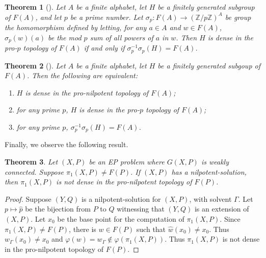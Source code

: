 \documentclass[11pt]{amsart}
\newtheorem{theorem}{Theorem}[section]
\newtheorem{lemma}[theorem]{Lemma}
\theoremstyle{definition}
\theoremstyle{definition}
\numberwithin{equation}{section}
\begin{document}

\begin{theorem}[{\cite[Corollary 3.5]{MSW01}}]\label{thm:MSW} Let $A$ be a finite alphabet, let $H$ be a finitely generated subgroup of $F(A)$, and let $p$ be a prime number. Let $\sigma_p\colon F(A)\to (\mathbb{Z}/p\mathbb{Z})^A$ be group the homomorphism defined by letting, for any $a\in A$ and $w\in F(A)$, $\sigma_p(w)(a)$ be the mod $p$ sum of all powers of $a$ in $w$. Then $H$ is dense in the pro-$p$ topology of $F(A)$ if and only if $\sigma_p^{-1}\sigma_p(H)=F(A)$.
\end{theorem}

\begin{theorem}[{\cite[Corollary 4.2]{MSW01}}] \label{thm:MSW2} Let $A$ be a finite alphabet, let $H$ be a finitely generated subgoup of $F(A)$. Then the following are equivalent:
\begin{enumerate}
\item[\rm (i)] $H$ is dense in the pro-nilpotent topology of $F(A)$;
\item[\rm (ii)] for any prime $p$, $H$ is dense in the pro-$p$ topology of $F(A)$;
\item[\rm (iii)] for any prime $p$, $\sigma_p^{-1}\sigma_p(H)=F(A)$.
\end{enumerate}
\end{theorem}

Finally, we observe the following result.

\begin{theorem}\label{thm:nonil} Let $(X,P)$ be an EP problem where $G(X, P)$ is weakly connected. Suppose $\pi_1(X, P)\neq F(P)$. If $(X, P)$ has a nilpotent-solution, then $\pi_1(X, P)$ is not dense in the pro-nilpotent topology of $F(P)$.
\end{theorem}

\begin{proof} Suppose $(Y, Q)$ is a nilpotent-solution for $(X, P)$, with solvent $\Gamma$. Let $p\mapsto \hat{p}$ be the bijection from $P$ to $Q$ witnessing that $(Y, Q)$ is an extension of $(X, P)$. Let $x_0$ be the base point for the computation of $\pi_1(X, P)$. Since $\pi_1(X, P)\neq F(P)$, there is $w\in F(P)$ such that $\hat{w}(x_0)\neq x_0$. Thus $w_\Gamma(x_0)\neq x_0$ and $\varphi(w)=w_\Gamma\not\in \varphi(\pi_1(X, P))$. Thus $\pi_1(X, P)$ is not dense in the pro-nilpotent topology of $F(P)$.
\end{proof}
\end{document}
